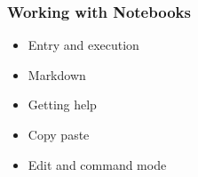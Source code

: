 \documentclass[
    xcolor={svgnames,dvipsnames},
    hyperref={colorlinks, citecolor=DeepPink4, linkcolor=DarkRed, urlcolor=DarkBlue}
    ]{beamer}  %
\newcommand{\1}{\mathbbm 1}
\begin{document}
\begin{frame}
    \frametitle{Working with Notebooks}

    \begin{itemize}
        \item Entry and execution
    \vspace{1em}
        \item Markdown
    \vspace{1em}
        \item Getting help
    \vspace{1em}
        \item Copy paste
    \vspace{1em}
        \item Edit and command mode
    \end{itemize}

\end{frame}
\end{document}
